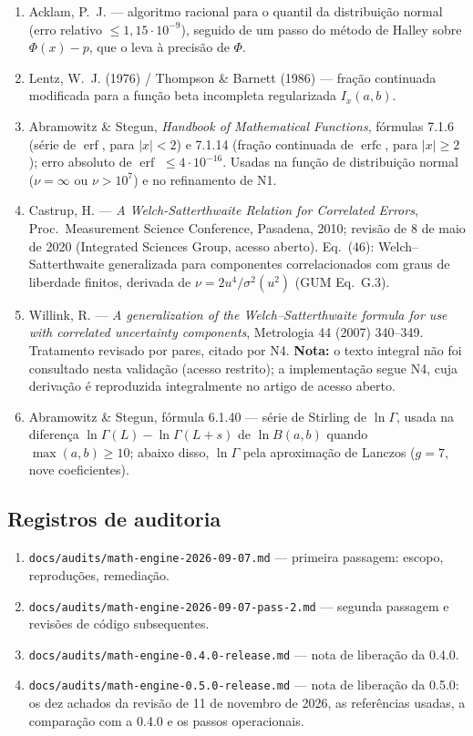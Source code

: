 \documentclass[11pt,a4paper]{article}
\newcommand{\docVersion}{0.5.0}
\newcommand{\previousVersion}{0.4.0}
\newcommand{\reviewDate}{11 de novembro de 2026}
\begin{document}
\begin{enumerate}[label=N\arabic*., leftmargin=2.6em]
  \item Acklam, P.~J. --- algoritmo racional para o quantil da distribuição normal (erro relativo \(\leq 1{,}15 \cdot 10^{-9}\)), seguido de um passo do método de Halley sobre \(\Phi(x) - p\), que o leva à precisão de \(\Phi\).
  \item Lentz, W.~J. (1976) / Thompson \& Barnett (1986) --- fração continuada modificada para a função beta incompleta regularizada \(I_x(a,b)\).
  \item Abramowitz \& Stegun, \emph{Handbook of Mathematical Functions}, fórmulas 7.1.6 (série de \(\operatorname{erf}\), para \(|x| < 2\)) e 7.1.14 (fração continuada de \(\operatorname{erfc}\), para \(|x| \geq 2\)); erro absoluto de \(\operatorname{erf}\) \(\leq 4 \cdot 10^{-16}\). Usadas na função de distribuição normal (\(\nu = \infty\) ou \(\nu > 10^7\)) e no refinamento de N1.
  \item Castrup, H. --- \emph{A Welch-Satterthwaite Relation for Correlated Errors}, Proc.\ Measurement Science Conference, Pasadena, 2010; revisão de 8 de maio de 2020 (Integrated Sciences Group, acesso aberto). Eq.~(46): Welch--Satterthwaite generalizada para componentes correlacionados com graus de liberdade finitos, derivada de \(\nu = 2u^4/\sigma^2(u^2)\) (GUM Eq.~G.3).
  \item Willink, R. --- \emph{A generalization of the Welch--Satterthwaite formula for use with correlated uncertainty components}, Metrologia 44 (2007) 340--349. Tratamento revisado por pares, citado por N4. \textbf{Nota:} o texto integral não foi consultado nesta validação (acesso restrito); a implementação segue N4, cuja derivação é reproduzida integralmente no artigo de acesso aberto.
  \item Abramowitz \& Stegun, fórmula 6.1.40 --- série de Stirling de \(\ln\Gamma\), usada na diferença \(\ln\Gamma(L) - \ln\Gamma(L + s)\) de \(\ln B(a, b)\) quando \(\max(a, b) \geq 10\); abaixo disso, \(\ln\Gamma\) pela aproximação de Lanczos (\(g = 7\), nove coeficientes).
\end{enumerate}

\subsection{Registros de auditoria}

\begin{enumerate}[label=A\arabic*., leftmargin=2.6em]
  \item \texttt{docs/audits/math-engine-2026-09-07.md} --- primeira passagem: escopo, reproduções, remediação.
  \item \texttt{docs/audits/math-engine-2026-09-07-pass-2.md} --- segunda passagem e revisões de código subsequentes.
  \item \texttt{docs/audits/math-engine-0.4.0-release.md} --- nota de liberação da \previousVersion{}.
  \item \texttt{docs/audits/math-engine-0.5.0-release.md} --- nota de liberação da \docVersion{}: os dez achados da revisão de \reviewDate{}, as referências usadas, a comparação com a \previousVersion{} e os passos operacionais.
\end{enumerate}
\end{document}
